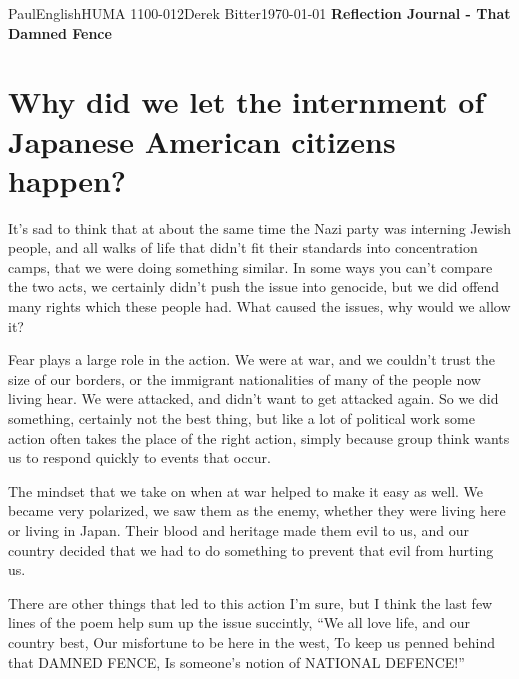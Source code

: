 \documentclass[12pt,letterpaper]{article}
\begin{document}
\begin{mla}{Paul}{English}{HUMA 1100-012}{Derek
    Bitter}{\today}    
    {\textbf{Reflection Journal - That Damned Fence}}

\section*{Why did we let the internment of Japanese American citizens happen?}

It's sad to think that at about the same time the Nazi party was interning Jewish people, and all walks of life that didn't fit their standards into concentration camps, that we were doing something similar. In some ways you can't compare the two acts, we certainly didn't push the issue into genocide, but we did offend many rights which these people had. What caused the issues, why would we allow it?

Fear plays a large role in the action. We were at war, and we couldn't trust the size of our borders, or the immigrant nationalities of many of the people now living hear. We were attacked, and didn't want to get attacked again. So we did something, certainly not the best thing, but like a lot of political work some action often takes the place of the right action, simply because group think wants us to respond quickly to events that occur.

The mindset that we take on when at war helped to make it easy as well. We became very polarized, we saw them as the enemy, whether they were living here or living in Japan. Their blood and heritage made them evil to us, and our country decided that we had to do something to prevent that evil from hurting us.

There are other things that led to this action I'm sure, but I think the last few lines of the poem help sum up the issue succintly, ``We all love life, and our country best, Our misfortune to be here in the west, To keep us penned behind that DAMNED FENCE, Is someone's notion of NATIONAL DEFENCE!''



%


\end{mla}
\end{document}
